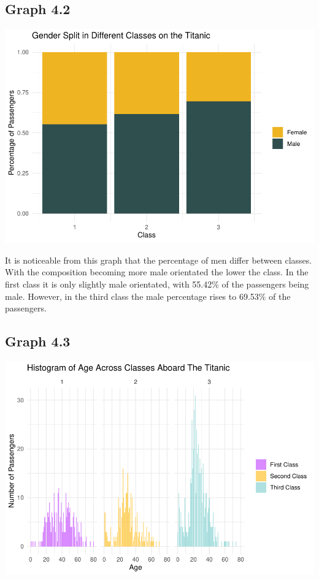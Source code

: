 \documentclass[
  11pt,
]{article}
\begin{document}
\hypertarget{graph-4.2}{%
\subsection{Graph 4.2}\label{graph-4.2}}

\includegraphics{README_files/figure-latex/unnamed-chunk-3-1.pdf}

It is noticeable from this graph that the percentage of men differ
between classes. With the composition becoming more male orientated the
lower the class. In the first class it is only slightly male orientated,
with 55.42\% of the passengers being male. However, in the third class
the male percentage rises to 69.53\% of the passengers.

\hypertarget{graph-4.3}{%
\subsection{Graph 4.3}\label{graph-4.3}}

\includegraphics{README_files/figure-latex/unnamed-chunk-4-1.pdf}
\end{document}
